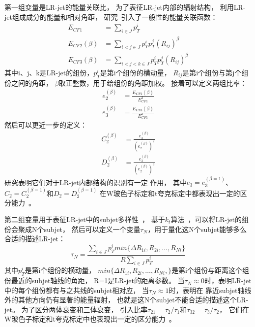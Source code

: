 第一组变量是LR-jet的能量关联比，
为了表征LR-jet内部的辐射结构，
利用LR-jet组成成分的能量和相对角距，
研究~\cite{JSS1,JSS2}引入了一般性的能量关联函数：
\begin{equation} 
\label{eq:JSS1}
 \begin{split}
E_{CF1}&=\sum_{i\in J} p_{T}^i
\\
E_{CF2}(\beta)&=\sum_{i<j\in J} p_T^i p_T^j (R_{ij})^\beta
 \\
E_{CF3}(\beta)&=\sum_{i<j<k\in J} p_T^i p_T^j (R_{ij})^\beta
 \end{split}
\end{equation}
其中i、j、k是LR-jet的组份，$p_{T}^i$是第i个组份的横动量，
$R_{ij}$是第i个组份与第j个组份之间的角距，
$\beta$取正整数，用于给组份的角距加权。
接着可以定义两组比率：
\begin{equation} 
\label{eq:JSS2}
 \begin{split}
e_2^{(\beta)}&=\frac{E_{CF2}(\beta)}{E_{CF1}^2}
\\
e_3^{(\beta)}&=\frac{E_{CF3}(\beta)}{E_{CF1}^3}
 \end{split}
\end{equation}
然后可以更近一步的定义：
\begin{equation} 
\label{eq:JSS3}
 \begin{split}
C_2^{(\beta)}&=\frac{e_3^{(\beta)}}{(e_2^{(\beta)})^2}
\\
D_2^{(\beta)}&=\frac{e_3^{(\beta)}}{(e_2^{(\beta)})^3}
 \end{split}
\end{equation}
研究表明它们对于LR-jet内部结构的识别有一定
作用，
其中$e_3=e_3^{(\beta=1)}$、$C_2=C_2^{(\beta=1)}$和$D_2=D_2^{(\beta=1)}$
在W玻色子标定和t夸克标定中都表现出一定的区分能力~\cite{JSCD2}。

第二组变量用于表征LR-jet中的subjet多样性~\cite{JSS3,JSS4}，
基于$k_t$算法~\cite{JSS14,JSTAU}，可以将LR-jet的组份会聚成N个subjet，
然后可以定义一个变量$\tau_N$，用于量化这N个subjet能够多么合适的描述LR-jet：
\begin{equation} 
\label{eq:JSS4}
\tau_N = \frac{ \sum_{i\in J} p_T^i min \{ \Delta R_{1i},R_{2i},\dots ,R_{Ni} \} }{R\sum_{i\in J} p_T^i}
\end{equation}
其中$p_T^i$是第i个组份的横动量，
$min \{ \Delta R_{1i},R_{2i},\dots ,R_{Ni}, \}$是第i个组份与距离这个组份最近的subjet轴线的角距，
R=1是LR-jet的距离参数。
当$\tau_N \approx 0$时，表明LR-jet中的每个组份都有与之共线的subjet相对应，
当$\tau_N \approx 1$时，表明在
靠近subjet轴线外的其他方向仍有显著的能量辐射，
也就是这N个subjet不能合适的描述这个LR-jet。
为了区分两体衰变和三体衰变，
引入比率$\tau_{21}=\tau_2/\tau_1$和$\tau_{32}=\tau_3/\tau_2$，
它们在W玻色子标定和t夸克标定中也表现出一定的区分能力~\cite{JSS3}。

